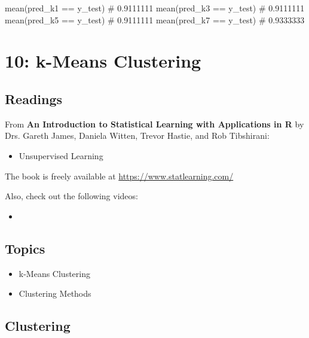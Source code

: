\documentclass[
  letterpaper,
  DIV=11,
  numbers=noendperiod]{scrreprt}
\newenvironment{Shaded}{\begin{snugshade}}{\end{snugshade}}
\newcommand{\CommentTok}[1]{\textcolor[rgb]{0.37,0.37,0.37}{#1}}
\newcommand{\FunctionTok}[1]{\textcolor[rgb]{0.28,0.35,0.67}{#1}}
\newcommand{\NormalTok}[1]{\textcolor[rgb]{0.00,0.23,0.31}{#1}}
\newcommand{\SpecialCharTok}[1]{\textcolor[rgb]{0.37,0.37,0.37}{#1}}
\providecommand{\tightlist}{%
  \setlength{\itemsep}{0pt}\setlength{\parskip}{0pt}}\usepackage{longtable,booktabs,array}
\begin{document}
\begin{tcolorbox}
\begin{Shaded}
\begin{Highlighting}[]
\FunctionTok{mean}\NormalTok{(pred\_k1 }\SpecialCharTok{==}\NormalTok{ y\_test)    }\CommentTok{\# 0.9111111}
\FunctionTok{mean}\NormalTok{(pred\_k3 }\SpecialCharTok{==}\NormalTok{ y\_test)    }\CommentTok{\# 0.9111111}
\FunctionTok{mean}\NormalTok{(pred\_k5 }\SpecialCharTok{==}\NormalTok{ y\_test)    }\CommentTok{\# 0.9111111}
\FunctionTok{mean}\NormalTok{(pred\_k7 }\SpecialCharTok{==}\NormalTok{ y\_test)    }\CommentTok{\# 0.9333333}
\end{Highlighting}
\end{Shaded}

\end{tcolorbox}

\chapter{10: k-Means Clustering}\label{k-means-clustering}

\section{Readings}\label{readings-11}

From \textbf{An Introduction to Statistical Learning with Applications
in R} by Drs. Gareth James, Daniela Witten, Trevor Hastie, and Rob
Tibshirani:

\begin{itemize}
\tightlist
\item
  Unsupervised Learning
\end{itemize}

The book is freely available at \url{https://www.statlearning.com/}

Also, check out the following videos:

\begin{itemize}
\tightlist
\item
\end{itemize}

\section{Topics}\label{topics-13}

\begin{itemize}
\item
  k-Means Clustering
\item
  Clustering Methods
\end{itemize}

\section{Clustering}\label{clustering}
\end{document}
